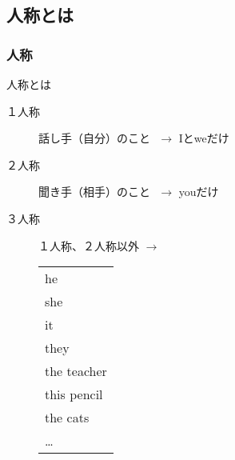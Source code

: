 \documentclass[aspectratio=169,xcolor={dvipsnames,table}]{beamer}
\begin{document}
\subsection{人称とは}
\begin{frame}[plain,label=ninsyo]\frametitle{人称}

\begin{alertblock}{人称とは}
\begin{description}
\item[１人称] 話し手（自分）のこと\pause{}\,\,{} $\longrightarrow$ Iとweだけ\pause
\item[２人称] 聞き手（相手）のこと\pause{}\,\,{} $\longrightarrow$ youだけ\pause
\item[３人称] １人称、２人称以外\pause{}\hspace{15pt} $\longrightarrow$%
 \begin{tabular}[t]{@{\,\,}l}
he\\\pause
she\\\pause
it\\\pause
they\\\pause
the teacher\\\pause
this pencil\\\pause
the cats\\\pause
\ldots
 \end{tabular}
\end{description}
\end{alertblock}
\end{frame}
\end{document}
